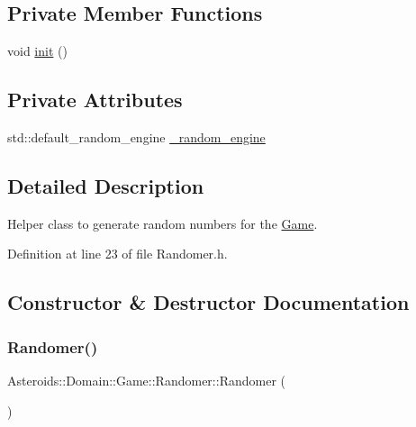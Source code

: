 \subsection*{Private Member Functions}
\begin{DoxyCompactItemize}
\item 
void \hyperlink{classAsteroids_1_1Domain_1_1Game_1_1Randomer_aaef0f9e57c6743748a2f0b2d944345ee}{init} ()
\end{DoxyCompactItemize}
\subsection*{Private Attributes}
\begin{DoxyCompactItemize}
\item 
std\+::default\+\_\+random\+\_\+engine \hyperlink{classAsteroids_1_1Domain_1_1Game_1_1Randomer_ab8883b05686f2c197fbe51bed15516db}{\+\_\+random\+\_\+engine}
\end{DoxyCompactItemize}


\subsection{Detailed Description}
Helper class to generate random numbers for the \hyperlink{classAsteroids_1_1Domain_1_1Game_1_1Game}{Game}. 

Definition at line 23 of file Randomer.\+h.



\subsection{Constructor \& Destructor Documentation}
\mbox{\label{classAsteroids_1_1Domain_1_1Game_1_1Randomer_a8e660c706ed181bde7b6f6310285b8e9}} 
\subsubsection{\texorpdfstring{Randomer()}{Randomer()}}
{\footnotesize\ttfamily Asteroids\+::\+Domain\+::\+Game\+::\+Randomer\+::\+Randomer (\begin{DoxyParamCaption}{ }\end{DoxyParamCaption})}



